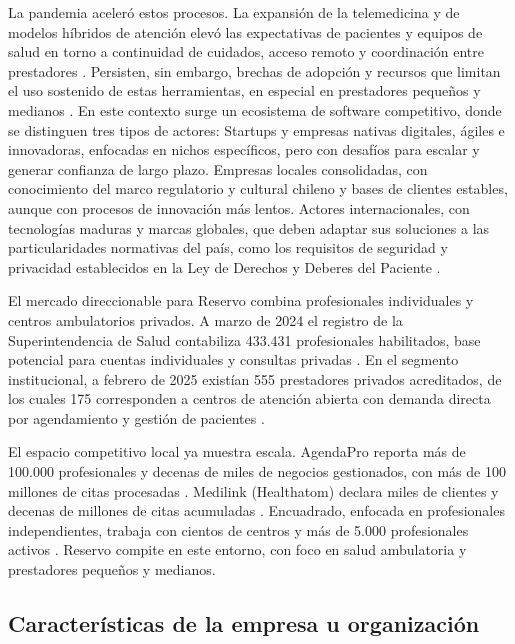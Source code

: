 La pandemia aceleró estos procesos. La expansión de la telemedicina y de modelos híbridos de atención elevó las expectativas de pacientes y equipos de salud en torno a continuidad de cuidados, acceso remoto y coordinación entre prestadores \citep{SuperSalud2025}. Persisten, sin embargo, brechas de adopción y recursos que limitan el uso sostenido de estas herramientas, en especial en prestadores pequeños y medianos \citep{RevChilSalud2025}. En este contexto surge un ecosistema de software competitivo, donde se distinguen tres tipos de actores: Startups y empresas nativas digitales, ágiles e innovadoras, enfocadas en nichos específicos, pero con desafíos para escalar y generar confianza de largo plazo. Empresas locales consolidadas, con conocimiento del marco regulatorio y cultural chileno y bases de clientes estables, aunque con procesos de innovación más lentos. Actores internacionales, con tecnologías maduras y marcas globales, que deben adaptar sus soluciones a las particularidades normativas del país, como los requisitos de seguridad y privacidad establecidos en la Ley de Derechos y Deberes del Paciente \citep{Ley20584}.

El mercado direccionable para Reservo combina profesionales individuales y centros ambulatorios privados. A marzo de 2024 el registro de la Superintendencia de Salud contabiliza 433.431 profesionales habilitados, base potencial para cuentas individuales y consultas privadas \citep{ClinicasChile2025}. En el segmento institucional, a febrero de 2025 existían 555 prestadores privados acreditados, de los cuales 175 corresponden a centros de atención abierta con demanda directa por agendamiento y gestión de pacientes \citep{Superintendencia2025Acreditados}.

El espacio competitivo local ya muestra escala. AgendaPro reporta más de 100.000 profesionales y decenas de miles de negocios gestionados, con más de 100 millones de citas procesadas \citep{AgendaPro2025BusinessWire}. Medilink (Healthatom) declara miles de clientes y decenas de millones de citas acumuladas \citep{MedilinkWeb2025}. Encuadrado, enfocada en profesionales independientes, trabaja con cientos de centros y más de 5.000 profesionales activos \citep{Encuadrado2025Centros}. Reservo compite en este entorno, con foco en salud ambulatoria y prestadores pequeños y medianos.

\subsection{Características de la empresa u organización}


